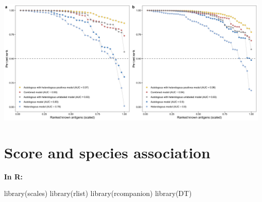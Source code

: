 \documentclass[
  11pt,
  oneside]{book}
\newenvironment{Shaded}{\begin{snugshade}}{\end{snugshade}}
\newcommand{\FunctionTok}[1]{\textcolor[rgb]{0.00,0.00,0.00}{#1}}
\newcommand{\NormalTok}[1]{#1}
\begin{document}
\begin{center}\includegraphics[width=1\linewidth]{./figures/Supplementary Fig 6} \end{center}

\hypertarget{score-and-species-association}{%
\section{Score and species association}\label{score-and-species-association}}

\textbf{In R: }

\begin{Shaded}
\begin{Highlighting}[]
\FunctionTok{library}\NormalTok{(scales)}
\FunctionTok{library}\NormalTok{(rlist)}
\FunctionTok{library}\NormalTok{(rcompanion)}
\FunctionTok{library}\NormalTok{(DT)}
\end{Highlighting}
\end{Shaded}
\end{document}
